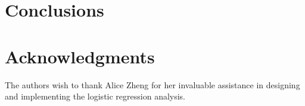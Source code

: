 \section{Conclusions}
\label{sec:conclusions}


\section{Acknowledgments}

The authors wish to thank Alice Zheng for her invaluable assistance in
designing and implementing the 
logistic regression analysis.

